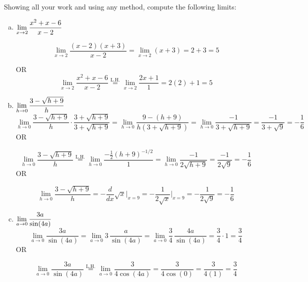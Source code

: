 \documentclass[12pt,letterpaper]{exam}
\newcommand{\lh}{\stackrel{\text{L.H.}}{=}}
\begin{document}
\begin{questions}

\newpage
{} \par\vspace{0.3cm}

Showing all your work and using any method, compute the following limits: \par\vspace{0.4cm}
	\begin{enumerate}[(a)]
	\item $\displaystyle\lim_{x \to 2} \dfrac{x^2 + x - 6}{x - 2}$ \par
		\[
		\lim_{x \to 2} \dfrac{(x - 2)(x + 3)}{x - 2}= \lim_{x \to 2} (x + 3)= 2 + 3= 5
		\] \par
		\phantom{.} \hfill OR \hfill \phantom{.} 
		\[
		\lim_{x \to 2} \dfrac{x^2 + x - 6}{x - 2} \lh \lim_{x \to 2} \dfrac{2x + 1}{1}= 2(2) + 1= 5
		\] \vfill
	
	\item $\displaystyle\lim_{h \to 0} \dfrac{3 - \sqrt{h + 9}}{h}$ \vfill
		\[
		\lim_{h \to 0} \dfrac{3 - \sqrt{h + 9}}{h} \cdot \dfrac{3 + \sqrt{h + 9}}{3 + \sqrt{h + 9}}= \lim_{h \to 0} \dfrac{9 - (h + 9)}{h (3 + \sqrt{h + 9})}= \lim_{h \to 0} \dfrac{-1}{3 + \sqrt{h + 9}}= \dfrac{-1}{3 + \sqrt{9}}= -\dfrac{1}{6}
		\] \pspace
		\phantom{.} \hfill OR \hfill \phantom{.} \par\vspace{0.1cm}
		\[
		\lim_{h \to 0} \dfrac{3 - \sqrt{h + 9}}{h} \lh \lim_{h \to 0} \dfrac{-\frac{1}{2} (h + 9)^{-1/2}}{1}= \lim_{h \to 0} \dfrac{-1}{2\sqrt{h + 9}}= \dfrac{-1}{2 \sqrt{9}}= -\dfrac{1}{6}
		\] \pspace
		\phantom{.} \hfill OR \hfill \phantom{.} \par\vspace{0.1cm}
		\[
		\lim_{h \to 0} \dfrac{3 - \sqrt{h + 9}}{h}= -\dfrac{d}{dx} \sqrt{x} \bigg|_{x= 9}= -\dfrac{1}{2\sqrt{x}} \bigg|_{x=9}= -\dfrac{1}{2 \sqrt{9}}= -\dfrac{1}{6}
		\] \pspace
	
	\item $\displaystyle\lim_{a \to 0} \dfrac{3a}{\sin(4a)}$ \vfill
		\[
		\lim_{a \to 0} \dfrac{3a}{\sin(4a)}= \lim_{a \to 0} 3\, \dfrac{a}{\sin(4a)}= \lim_{a \to 0} \dfrac{3}{4} \, \dfrac{4a}{\sin(4a)}= \dfrac{3}{4} \cdot 1= \dfrac{3}{4}
		\] \pspace
		\phantom{.} \hfill OR \hfill \phantom{.} \par\vspace{0.1cm}
		\[
		\lim_{a \to 0} \dfrac{3a}{\sin(4a)} \lh \lim_{a \to 0} \dfrac{3}{4 \cos(4a)}= \dfrac{3}{4 \cos(0)}= \dfrac{3}{4(1)}= \dfrac{3}{4}
		\] \vfill
	

\end{enumerate}
\end{questions}
\end{document}
